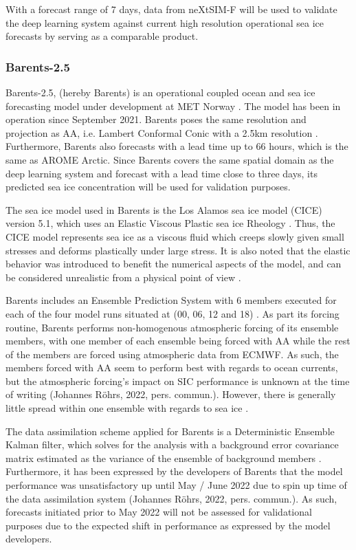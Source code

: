 \documentclass[../main/thesis.tex]{subfiles}
\begin{document}
With a forecast range of 7 days, data from neXtSIM-F will be used to validate the deep learning system against current high resolution operational sea ice forecasts by serving as a comparable product.

\subsubsection{Barents-2.5}
Barents-2.5, (hereby Barents) is an operational coupled ocean and sea ice forecasting model under development at MET Norway \citep{Roehrs2022}. The model has been in operation since September 2021. Barents poses the same resolution and projection as AA, i.e. Lambert Conformal Conic with a 2.5km resolution \citep{Roehrs2022,Mueller2017}. Furthermore, Barents also forecasts with a lead time up to 66 hours, which is the same as AROME Arctic. Since Barents covers the same spatial domain as the deep learning system and forecast with a lead time close to three days, its predicted sea ice concentration will be used for validation purposes.

The sea ice model used in Barents is the Los Alamos sea ice model (CICE) version 5.1, which uses an Elastic Viscous Plastic sea ice Rheology \citep{Hunke2015}. Thus, the CICE model represents sea ice as a viscous fluid which creeps slowly given small stresses and deforms plastically under large stress. It is also noted that the elastic behavior was introduced to benefit the numerical aspects of the model, and can be considered unrealistic from a physical point of view \citep{Hunke1997}.

Barents includes an Ensemble Prediction System with 6 members executed for each of the four model runs situated at (00, 06, 12 and 18) \citep{Roehrs2022}. As part its forcing routine, Barents performs non-homogenous atmospheric forcing of its ensemble members, with one member of each ensemble being forced with AA while the rest of the members are forced using atmospheric data from ECMWF. As such, the members forced with AA seem to perform best with regards to ocean currents, but the atmospheric forcing's impact on SIC performance is unknown at the time of writing (Johannes Röhrs, 2022, pers. commun.). However, there is generally little spread within one ensemble with regards to sea ice \citep{Roehrs2022}.

The data assimilation scheme applied for Barents is a Deterministic Ensemble Kalman filter, which solves for the analysis with a background error covariance matrix estimated as the variance of the ensemble of background members \citep{Roehrs2022}. Furthermore, it has been expressed by the developers of Barents that the model performance was unsatisfactory up until May / June 2022 due to spin up time of the data assimilation system (Johannes Röhrs, 2022, pers. commun.). As such, forecasts initiated prior to May 2022 will not be assessed for validational purposes due to the expected shift in performance as expressed by the model developers.
\end{document}
